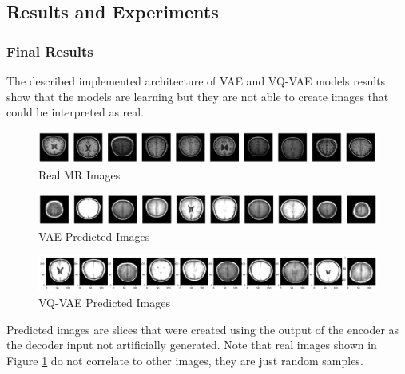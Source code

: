 \newpage 

\subsection{Results and Experiments}

\subsubsection{Final Results}

The described implemented architecture of VAE and VQ-VAE models results show that the models are learning but they are not able to create images that could be interpreted as real.

\begin{figure}[ht]
    \centering
    \includegraphics[width = 17cm]{images/mri-real-images.png}
    \caption[]{Real MR Images}
    \label{fig:mri-real-images}
\end{figure}

\begin{figure}[ht]
    \centering
    \includegraphics[width = 17cm]{images/vae-brains-results.png}
    \caption[]{VAE Predicted Images}
    \label{fig:vae-k3-brains-30-epochs}
\end{figure}

\begin{figure}[ht]
    \centering
    \includegraphics[width = 17cm]{images/vqvae-brains-results.png}
    \caption[]{VQ-VAE Predicted Images}
    \label{fig:vae-k3-brains-30-epochs}
\end{figure}

Predicted images are slices that were created using the output of the encoder as the decoder input not artificially generated. Note that real images shown in Figure \ref{fig:mri-real-images} do not correlate to other images, they are just random samples.

